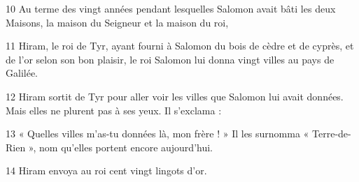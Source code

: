 
10 Au terme des vingt années pendant lesquelles Salomon avait bâti les deux Maisons, la maison du Seigneur et la maison du roi,

11 Hiram, le roi de Tyr, ayant fourni à Salomon du bois de cèdre et de cyprès, et de l’or selon son bon plaisir, le roi Salomon lui donna vingt villes au pays de Galilée.

12 Hiram sortit de Tyr pour aller voir les villes que Salomon lui avait données. Mais elles ne plurent pas à ses yeux. Il s’exclama :

13 « Quelles villes m’as-tu données là, mon frère ! » Il les surnomma « Terre-de-Rien », nom qu’elles portent encore aujourd’hui.

14 Hiram envoya au roi cent vingt lingots d’or.